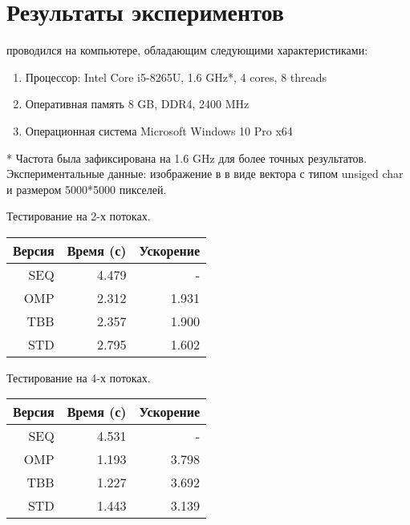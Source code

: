 \documentclass{report}
\begin{document}
    \newpage
    \section*{Результаты экспериментов}
    
     проводился на компьютере, обладающим следующими характеристиками:
    \begin{enumerate}
        \item Процессор: Intel Core i5-8265U, 1.6 GHz*, 4 cores, 8 threads
        \item Оперативная память 8 GB, DDR4, 2400 MHz
        \item Операционная система Microsoft Windows 10 Pro x64
    \end{enumerate}
    * Частота была зафиксирована на 1.6 GHz для более точных результатов. \\
    Экспериментальные данные: изображение в в виде вектора с типом unsiged char и размером 5000*5000 пикселей.\\
    
    \par Тестирование на 2-х потоках.
    \begin{table}[!h]
    \centering
    \begin{tabular}{| r | r | r |}
    \hline
    Версия & Время (с) & Ускорение \\[5pt]
    \hline
    SEQ & 4.479 & -     \\
    OMP & 2.312 & 1.931 \\
    TBB & 2.357 & 1.900 \\
    STD & 2.795 & 1.602 \\
    \hline
    \end{tabular}
    \end{table}
    
    \par Тестирование на 4-х потоках.
    \begin{table}[!h]
    \centering
    \begin{tabular}{| r | r | r |}
    \hline
    Версия & Время (с) & Ускорение \\[5pt]
    \hline
    SEQ & 4.531 & -     \\
    OMP & 1.193 & 3.798 \\
    TBB & 1.227 & 3.692 \\
    STD & 1.443 & 3.139 \\
    \hline
    \end{tabular}
    \end{table}
\end{document}
